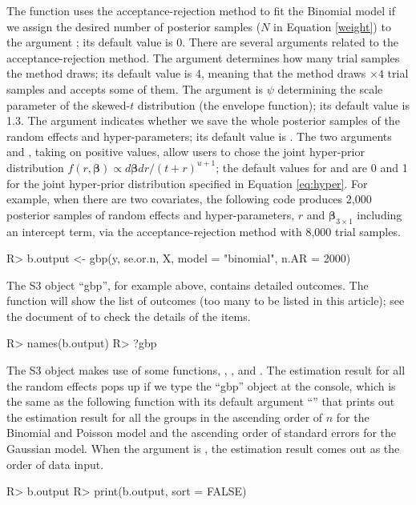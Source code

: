 \documentclass[article]{jss}
\begin{document}
The function  uses the acceptance-rejection method to fit the Binomial model if we assign the desired number of posterior samples ($N$ in Equation \ref{weight}) to the argument ; its default value is 0. There are several arguments related to the acceptance-rejection method. The argument  determines how many trial samples the method draws; its default value is 4, meaning that the method draws  $\times4$ trial samples and accepts some of them. The argument  is $\psi$ determining the scale parameter of the skewed-$t$ distribution (the envelope function); its default value is 1.3. The argument  indicates whether we save the whole posterior samples of the random effects and hyper-parameters; its default value is . The two arguments  and , taking on positive values, allow users to chose the joint hyper-prior distribution $f(r, \boldsymbol{\beta})\propto d\boldsymbol{\beta}dr/(t+r)^{u+1}$; the default values for  and  are 0 and 1 for the joint hyper-prior distribution specified in Equation \ref{eq:hyper}. For example, when there are two covariates, the following code produces 2,000 posterior samples of random effects and hyper-parameters, $r$ and $\boldsymbol{\beta}_{3\times1}$ including an intercept term, via the acceptance-rejection method with 8,000 trial samples.
\begin{CodeChunk}
\begin{CodeInput}
R> b.output <- gbp(y, se.or.n, X, model = "binomial", n.AR = 2000)
\end{CodeInput}
\end{CodeChunk}

The S3 object ``gbp'', for example  above, contains detailed outcomes. The function  will show the list of outcomes (too many to be listed in this article); see the document of  to check the details of the items.
\begin{CodeChunk}
\begin{CodeInput}
R> names(b.output)
R> ?gbp
\end{CodeInput}
\end{CodeChunk}

The S3 object makes use of some functions, , , and . The estimation result for all the random effects pops up if we type the ``gbp'' object at the  console, which is the same as the following function  with its default argument ``'' that prints out the estimation result for all the groups in the ascending order of $n$ for the Binomial and Poisson model and the ascending order of standard errors for the Gaussian model. When the argument  is , the estimation result comes out as the order of data input.
\begin{CodeChunk}
\begin{CodeInput}
R> b.output
R> print(b.output, sort = FALSE)
\end{CodeInput}
\end{CodeChunk}
\end{document}
